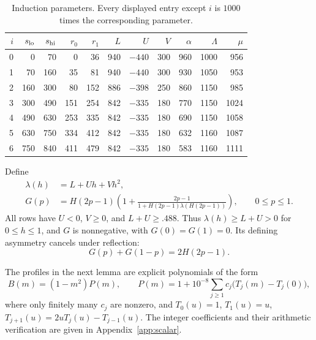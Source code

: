 \begin{table}[htbp]
\centering
\small
\setlength{\tabcolsep}{3.5pt}
\begin{tabular}{rrrrrrrrrrr}
\toprule
$i$ & $s_{\rm lo}$ & $s_{\rm hi}$ & $r_0$ & $r_1$ & $L$ & $U$ & $V$
    & $\alpha$ & $\Lambda$ & $\mu$\\
\midrule
0 & 0   & 70  & 0   & 36  & 940 & $-440$ & 300 & 960 & 1000 & 956\\
1 & 70  & 160 & 35  & 81  & 940 & $-440$ & 300 & 930 & 1050 & 953\\
2 & 160 & 300 & 80  & 152 & 886 & $-398$ & 250 & 860 & 1150 & 985\\
3 & 300 & 490 & 151 & 254 & 842 & $-335$ & 180 & 770 & 1150 & 1024\\
4 & 490 & 630 & 253 & 335 & 842 & $-335$ & 180 & 690 & 1150 & 1058\\
5 & 630 & 750 & 334 & 412 & 842 & $-335$ & 180 & 632 & 1160 & 1087\\
6 & 750 & 840 & 411 & 479 & 842 & $-335$ & 180 & 583 & 1160 & 1111\\
\bottomrule
\end{tabular}
\caption{Induction parameters.  Every displayed entry except $i$ is
$1000$ times the corresponding parameter.}
\label{ind:tab:parameters}
\end{table}

Define
\begin{equation}\label{ind:eq:G}
 \begin{split}
 \lambda(h)&=L+Uh+Vh^2,\\
 G(p)&=H(2p-1)\left(1+
 \frac{2p-1}{1+H(2p-1)\lambda(H(2p-1))}\right),\qquad 0\le p\le1.
 \end{split}
\end{equation}
All rows have $U<0$, $V\ge0$, and $L+U\ge .488$.  Thus
$\lambda(h)\ge L+U>0$ for $0\le h\le1$, and $G$ is nonnegative,
with $G(0)=G(1)=0$.  Its defining asymmetry cancels under reflection:
\begin{equation}\label{ind:eq:G-reflection}
 G(p)+G(1-p)=2H(2p-1).
\end{equation}

The profiles in the next lemma are explicit polynomials of the form
\begin{equation}\label{ind:eq:profile-def}
 B(m)=(1-m^2)P(m),\qquad
 P(m)=1+10^{-8}\sum_{j\ge1}c_j\bigl(T_j(m)-T_j(0)\bigr),
\end{equation}
where only finitely many $c_j$ are nonzero, and
$T_0(u)=1$, $T_1(u)=u$, $T_{j+1}(u)=2uT_j(u)-T_{j-1}(u)$.
The integer coefficients and their arithmetic verification are given in
Appendix~\ref{app:scalar}.

